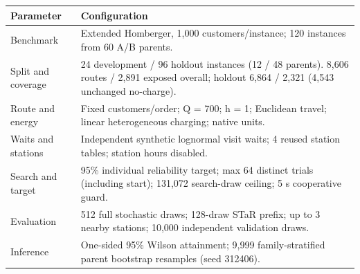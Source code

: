 \begingroup
\small
\setlength{\tabcolsep}{4pt}
\renewcommand{\arraystretch}{1.12}
\noindent
\begin{tabular}{@{}p{34mm}p{138mm}@{}}
\toprule
\textbf{Parameter} & \textbf{Configuration} \\
\midrule
{\raggedright Benchmark\par} & {\raggedright Extended Homberger, 1,000 customers/instance; 120 instances from 60 A/B parents.\par} \\
{\raggedright Split and coverage\par} & {\raggedright 24 development / 96 holdout instances (12 / 48 parents). 8,606 routes / 2,891 exposed overall; holdout 6,864 / 2,321 (4,543 unchanged no-charge).\par} \\
{\raggedright Route and energy\par} & {\raggedright Fixed customers/order; Q = 700; h = 1; Euclidean travel; linear heterogeneous charging; native units.\par} \\
{\raggedright Waits and stations\par} & {\raggedright Independent synthetic lognormal visit waits; 4 reused station tables; station hours disabled.\par} \\
{\raggedright Search and target\par} & {\raggedright 95\% individual reliability target; max 64 distinct trials (including start); 131,072 search-draw ceiling; 5 s cooperative guard.\par} \\
{\raggedright Evaluation\par} & {\raggedright 512 full stochastic draws; 128-draw STaR prefix; up to 3 nearby stations; 10,000 independent validation draws.\par} \\
{\raggedright Inference\par} & {\raggedright One-sided 95\% Wilson attainment; 9,999 family-stratified parent bootstrap resamples (seed 312406).\par} \\
\bottomrule
\end{tabular}
\endgroup
